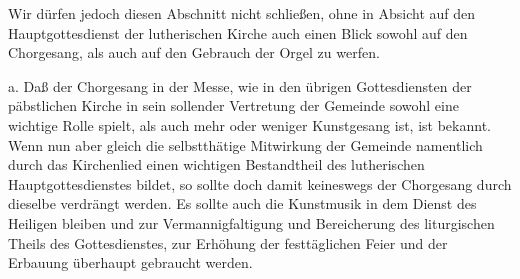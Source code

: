 Wir dürfen jedoch diesen Abschnitt nicht schließen, ohne in Absicht auf den Hauptgottesdienst der lutherischen Kirche auch einen Blick sowohl auf den Chorgesang, als auch auf den Gebrauch der Orgel zu werfen.

a. Daß der Chorgesang in der Messe, wie in den übrigen Gottesdiensten der päbstlichen Kirche in sein sollender Vertretung der Gemeinde sowohl eine wichtige Rolle spielt, als auch mehr oder weniger Kunstgesang ist, ist bekannt. Wenn nun aber gleich die selbstthätige Mitwirkung der Gemeinde namentlich durch das Kirchenlied einen wichtigen Bestandtheil des lutherischen Hauptgottesdienstes bildet, so sollte doch damit keineswegs der Chorgesang durch dieselbe verdrängt werden. Es sollte auch die Kunstmusik in dem Dienst des Heiligen bleiben und zur Vermannigfaltigung und Bereicherung des liturgischen Theils des Gottesdienstes, zur Erhöhung der festtäglichen Feier und der Erbauung überhaupt gebraucht werden.

